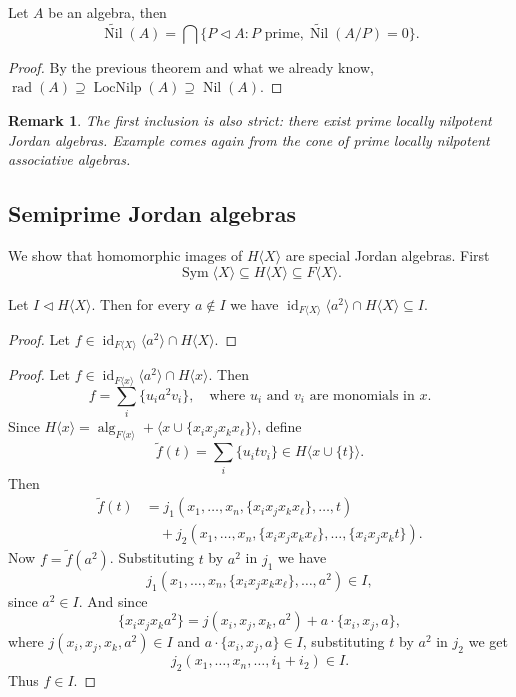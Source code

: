 \documentclass{article}
\newtheorem{remark}[theorem]{Remark}
\begin{document}
\begin{theorem}
Let $A$ be an algebra, then
\[
\widetilde{\operatorname{Nil}}(A)=\bigcap\{P\triangleleft A : P \text{ prime}, \widetilde{\operatorname{Nil}}(A/P)=0\}.
\]
\end{theorem}

\begin{proof}
By the previous theorem and what we already know, $\operatorname{rad}(A)\supseteq \operatorname{LocNilp}(A)\supseteq \operatorname{Nil}(A)$.
\end{proof}

\begin{remark}
The first inclusion is also strict: there exist prime locally nilpotent Jordan algebras.
Example comes again from the cone of prime locally nilpotent associative algebras.
\end{remark}

\subsection*{Semiprime Jordan algebras}
We show that homomorphic images of $H\langle X\rangle$ are special Jordan algebras.
First
\[
\operatorname{Sym}\langle X\rangle \subseteq H\langle X\rangle \subseteq F\langle X\rangle.
\]

\begin{lemma}
Let $I\triangleleft H\langle X\rangle$.
Then for every $a\notin I$ we have $\operatorname{id}_{F\langle X\rangle}\langle a^2\rangle \cap H\langle X\rangle \subseteq I$.
\end{lemma}

\begin{proof}
Let $f\in \operatorname{id}_{F\langle X\rangle}\langle a^2\rangle \cap H\langle X\rangle$.
\end{proof}

\begin{proof}
Let $f \in \operatorname{id}_{F\langle x\rangle}\langle a^{2}\rangle \cap H\langle x\rangle$. Then
\[
f = \sum_i \{u_i a^{2} v_i\}, \quad \text{where } u_i \text{ and } v_i \text{ are monomials in } x.
\]
Since $H\langle x\rangle = \operatorname{alg}_{F\langle x\rangle} + \langle x \cup \{x_i x_j x_k x_\ell\}\rangle$, define
\[
\tilde{f}(t) = \sum_i \{u_i t v_i\} \in H\langle x \cup \{t\}\rangle.
\]
Then
\begin{align*}
\tilde{f}(t) &= j_1(x_1,\dots,x_n,\{x_i x_j x_k x_\ell\},\dots, t) \\
&\quad + j_2(x_1,\dots,x_n,\{x_i x_j x_k x_\ell\},\dots,\{x_i x_j x_k t\}).
\end{align*}
Now $f = \tilde{f}(a^{2})$. Substituting $t$ by $a^{2}$ in $j_1$ we have
\[
j_1(x_1,\dots,x_n,\{x_i x_j x_k x_\ell\},\dots, a^{2}) \in I,
\]
since $a^{2} \in I$. And since
\[
\{x_i x_j x_k a^{2}\} = j(x_i, x_j, x_k, a^{2}) + a \cdot \{x_i, x_j, a\},
\]
where $j(x_i, x_j, x_k, a^{2}) \in I$ and $a \cdot \{x_i, x_j, a\} \in I$, substituting $t$ by $a^{2}$ in $j_2$ we get
\[
j_2(x_1,\dots,x_n,\dots, i_1 + i_2) \in I.
\]
Thus $f \in I$.
\end{proof}
\end{document}
